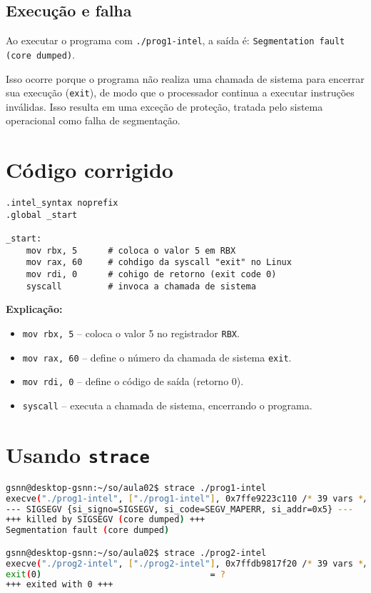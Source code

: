 \documentclass[12pt]{article}
\begin{document}
\subsection*{Execução e falha}

Ao executar o programa com \texttt{./prog1-intel}, a saída é:  
\texttt{Segmentation fault (core dumped)}.  

Isso ocorre porque o programa não realiza uma chamada de sistema para encerrar sua execução
(\texttt{exit}), de modo que o processador continua a executar instruções inválidas.
Isso resulta em uma exceção de proteção, tratada pelo sistema operacional como falha de
segmentação.

\section*{Código corrigido}

\begin{lstlisting}[style=modern, language={[x86masm]Assembler}]
.intel_syntax noprefix
.global _start

_start:
    mov rbx, 5      # coloca o valor 5 em RBX
    mov rax, 60     # cohdigo da syscall "exit" no Linux
    mov rdi, 0      # cohigo de retorno (exit code 0)
    syscall         # invoca a chamada de sistema
\end{lstlisting}

\textbf{Explicação:}

\begin{itemize}
  \item \texttt{mov rbx, 5} – coloca o valor 5 no registrador \texttt{RBX}.
  \item \texttt{mov rax, 60} – define o número da chamada de sistema \texttt{exit}.
  \item \texttt{mov rdi, 0} – define o código de saída (retorno 0).
  \item \texttt{syscall} – executa a chamada de sistema, encerrando o programa.
\end{itemize}

\newpage

\section*{Usando \texttt{strace}}

\begin{lstlisting}[style=modern, language=bash]
gsnn@desktop-gsnn:~/so/aula02$ strace ./prog1-intel 
execve("./prog1-intel", ["./prog1-intel"], 0x7ffe9223c110 /* 39 vars */) = 0
--- SIGSEGV {si_signo=SIGSEGV, si_code=SEGV_MAPERR, si_addr=0x5} ---
+++ killed by SIGSEGV (core dumped) +++
Segmentation fault (core dumped)

gsnn@desktop-gsnn:~/so/aula02$ strace ./prog2-intel 
execve("./prog2-intel", ["./prog2-intel"], 0x7ffdb9817f20 /* 39 vars */) = 0
exit(0)                                 = ?
+++ exited with 0 +++
\end{lstlisting}
\end{document}
